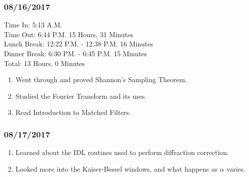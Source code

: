 \documentclass[crop=false,class=book]{standalone}
\begin{document}
\subsubsection{\footnotesize 08/16/2017}
Time In: 5:13 A.M.\\
Time Out: 6:44 P.M. \hfill 15 Hours, 31 Minutes\\
Lunch Break: 12:22 P.M. - 12:38 P.M. \hfill 16 Minutes\\
Dinner Break: 6:30 PM. - 6:45 P.M. \hfill 15 Minutes\\
Total: \hfill 13 Hours, 0 Minutes
\begin{enumerate}
    \item Went through and proved Shannon's Sampling Theorem.
    \item Studied the Fourier Transform and its uses.
    \item Read Introduction to Matched Filters.
\end{enumerate}
\subsubsection{\footnotesize 08/17/2017}
\begin{enumerate}
    \item Learned about the IDL routines used to perform diffraction correction.
    \item Looked more into the Kaiser-Bessel windows, and what happens as $\alpha$ varies.
\end{enumerate}
\end{document}
